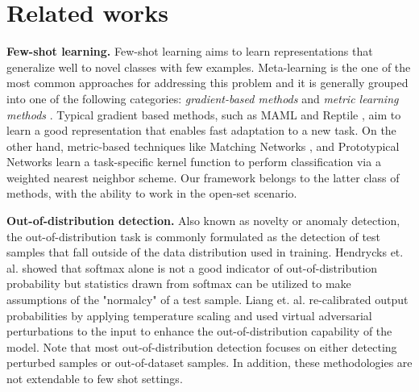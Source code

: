 \section{Related works}

\noindent \textbf{Few-shot learning.} Few-shot learning \cite{rohrbach2013transfer,raychaudhuri2020exploiting,guan2020zero} aims to learn representations that generalize well to novel classes with few examples. Meta-learning \cite{hospedales2020meta_survey} is the one of the most common approaches for addressing this problem and it is generally grouped into one of the following categories: \textit{gradient-based methods} \cite{maml,reptile} and \textit{metric learning methods} \cite{match_net,proto_net}. Typical gradient based methods, such as MAML \cite{maml} and Reptile \cite{reptile}, aim to learn a good representation that enables fast adaptation to a new task. On the other hand, metric-based techniques like Matching Networks \cite{match_net}, and Prototypical Networks \cite{proto_net} learn a task-specific kernel function to perform classification via a weighted nearest neighbor scheme. Our framework belongs to the latter class of methods, with the ability to work in the open-set scenario.\vspace{\baselineskip}

\noindent \textbf{Out-of-distribution detection.}
Also known as novelty or anomaly detection, the out-of-distribution task is commonly formulated as the detection of test samples that fall outside of the data distribution used in training. Hendrycks et. al. \cite{hendrycks17baseline} showed that softmax alone is not a good indicator of out-of-distribution probability but statistics drawn from softmax can be utilized to make assumptions of the "normalcy" of a test sample. Liang et. al. \cite{liang2020enhancing} re-calibrated output probabilities by applying temperature scaling and used virtual adversarial perturbations to the input to enhance the out-of-distribution capability of the model. Note that most out-of-distribution detection focuses on either detecting perturbed samples or out-of-dataset samples. In addition, these methodologies are not extendable to few shot settings. \vspace{\baselineskip}

